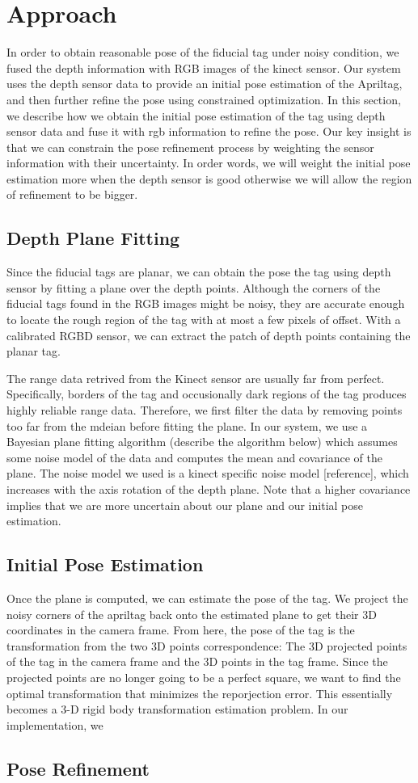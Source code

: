 \section{Approach}
\label{sec:approach}
In order to obtain reasonable pose of the fiducial tag under noisy condition, we fused the depth information with RGB images of the kinect sensor. Our system uses the depth sensor data to provide an initial pose estimation of the Apriltag, and then further refine the pose using constrained optimization. In this section, we describe how we obtain the initial pose estimation of the tag using depth sensor data and fuse it with rgb information to refine the pose. Our key insight is that we can constrain the pose refinement process by weighting the sensor information with their uncertainty. In order words, we will weight the initial pose estimation more when the depth sensor is good otherwise we will allow the region of refinement to be bigger. 

\subsection{Depth Plane Fitting}
Since the fiducial tags are planar, we can obtain the pose the tag using depth sensor by fitting a plane over the depth points. Although the corners of the fiducial tags found in the RGB images might be noisy, they are accurate enough to locate the rough region of the tag with at most a few pixels of offset. With a calibrated RGBD sensor, we can extract the patch of depth points containing the planar tag. 

The range data retrived from the Kinect sensor are usually far from perfect. Specifically, borders of the tag and occusionally dark regions of the tag produces highly reliable range data. Therefore, we first filter the data by removing points too far from the mdeian before fitting the plane. In our system, we use a Bayesian plane fitting algorithm (describe the algorithm below) which assumes some noise model of the data and computes the mean and covariance of the plane. The noise model we used is a kinect specific noise model [reference], which increases with the axis rotation of the depth plane. 
Note that a higher covariance implies that we are more uncertain about our plane and our initial pose estimation.

\subsection{Initial Pose Estimation}
Once the plane is computed, we can estimate the pose of the tag. We project the noisy corners of the apriltag back onto the estimated plane to get their 3D coordinates in the camera frame. From here, the pose of the tag is the transformation from the two 3D points correspondence: The 3D projected points of the tag in the camera frame and the 3D points in the tag frame. Since the projected points are no longer going to be a perfect square, we want to find the optimal transformation that minimizes the reporjection error. This essentially becomes a 3-D rigid body transformation estimation problem. In our implementation, we 

\subsection{Pose Refinement}